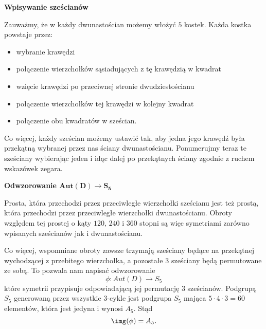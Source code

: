 \begin{wrapfigure}{l}{6cm}
\end{wrapfigure}

\textbf{Wpisywanie sześcianów}

Zauważmy, że w każdy dwunastościan możemy włożyć $5$ kostek. Każda kostka powstaje przez:
\begin{itemize}
  \item wybranie krawędzi
  \item połączenie wierzchołków sąsiadujących z tę krawędzią w kwadrat
  \item wzięcie krawędzi po przeciwnej stronie dwudziestościanu
  \item połączenie wierzchołków tej krawędzi w kolejny kwadrat
  \item połączenie obu kwadratów w sześcian.
\end{itemize}
Co więcej, każdy sześcian możemy ustawić tak, aby jedna jego krawędź była przekątną wybranej przez nas ściany dwunastościanu. Ponumerujmy teraz te sześciany wybierając jeden i idąc dalej po przekątnych ściany zgodnie z ruchem wskazówek zegara.

\textbf{Odwzorowanie $\boldsymbol{Aut(D)\to S_5}$}


Prosta, która przechodzi przez przeciwległe wierzchołki sześcianu jest też prostą, która przechodzi przez przeciwległe wierzchołki dwunastościanu. Obroty względem tej prostej o kąty $120$, $240$ i $360$ stopni są więc symetriami zarówno wpisanych sześcianów jak i dwunastościanu.

Co więcej, wspomniane obroty zawsze trzymają sześciany będące na przekątnej wychodzącej z przebitego wierzchołka, a pozostałe $3$ sześciany będą permutowane ze sobą. To pozwala nam napisać odwzorowanie 
$$\phi:Aut(D)\to S_5$$
które symetrii przypisuje odpowiadającą jej permutację $3$ sześcianów. Podgrupą $S_5$ generowaną przez wszystkie $3$-cykle jest podgrupa $S_5$ mająca $5\cdot 4\cdot 3=60$ elementów, która jest jedyna i wynosi $A_5$. Stąd 
$$\img(\phi)=A_5.$$

